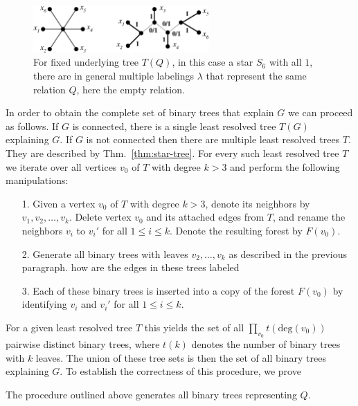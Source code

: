 \documentclass[smallextended]{svjour3}
\newcommand{\rev}[1]{\begingroup\color{blue}#1\endgroup}
\newcommand{\TODO}[1]{\begingroup\color{red}#1\endgroup}
\begin{document}
\begin{figure}[htbp]
\begin{center}
\includegraphics[width=0.6\textwidth]{non_lrt-new.eps}
\end{center}
\caption{For fixed underlying tree $T(Q)$, in this case a star $S_6$ with
  all $1$, there are in general multiple labelings $\lambda$ that represent
  the same relation $Q$, here the empty relation.}
\label{fig:non_lrt}
\end{figure}

 

  In order to obtain the complete set of binary trees that explain
  $G$ we can proceed as follows. If $G$ is connected, there is a single
  least resolved tree $T(G)$ explaining $G$. If $G$ is not connected then
  there are multiple least resolved trees $T$. They are described by
  Thm.~\ref{thm:star-tree}. For every such least resolved tree $T$ we
  iterate over all vertices $v_0$ of $T$ with degree $k>3$ and perform the
  following manipulations:
  \begin{itemize}
  \item[{1.}] Given a vertex $v_0$ of $T$ with degree $k>3$, denote its
    neighbors by $v_1, v_2,\dots, v_k$. Delete vertex $v_0$ and its attached
    edges from $T$, and rename the neighbors $v_i$ to $v_i'$ for all $1\leq
    i\leq k$. Denote the resulting forest by $F(v_0)$.
  \item[{2.}] Generate all binary trees with leaves $v_2,\dots, v_k$ as
    described in the previous paragraph.
    \TODO{how are the edges in these trees labeled}
  \item[{3.}] Each of these binary trees is inserted into a copy of the
    forest $F(v_0)$ by \rev{identifying} $v_i$ and $v_i'$ for all $1\leq
    i\leq k$.
  \end{itemize}
  For a given least resolved tree $T$ this yields the set of all
  $\prod_{v_0} t(\mathrm{deg}(v_0))$ pairwise distinct binary trees, where
  $t(k)$ denotes the number of binary trees with $k$ leaves. The union of
  these tree sets is then the set of all binary trees explaining $G$.  To
  establish the correctness of this procedure, we prove
\newline
\begin{lemma}\label{lem:binary}
  The procedure outlined above generates all binary trees representing $Q$.
\end{lemma}
\end{document}
